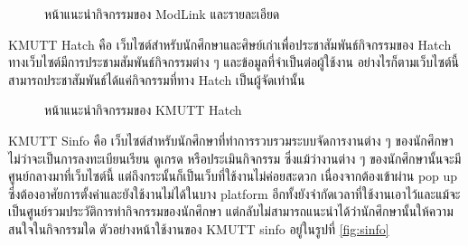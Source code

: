 \documentclass[14pt,oneside,openright,a4paper]{cpe-thai-project}
\begin{document}
  \begin{figure}[!h]\centering
    \setlength{\fboxrule}{0.5mm} %
    \setlength{\fboxsep}{0.5cm}
    \caption{หน้าแนะนำกิจกรรมของ ModLink และรายละเอียด}\label{fig:modlink}
    \end{figure}

\newpage

KMUTT Hatch คือ เว็บไซต์สำหรับนักศึกษาและศิษย์เก่าเพื่อประชาสัมพันธ์กิจกรรมของ Hatch ทางเว็บไซต์มีการประชามสัมพันธ์กิจกรรมต่าง ๆ และข้อมูลที่จำเป็นต่อผู้ใช้งาน อย่างไรก็ตามเว็บไซต์นี้สามารถประชาสัมพันธ์ได้แค่กิจกรรมที่ทาง Hatch เป็นผู้จัดเท่านั้น

  \begin{figure}[!h]\centering
    \setlength{\fboxrule}{0.5mm} %
    \setlength{\fboxsep}{0.5cm}
    \caption{หน้าแนะนำกิจกรรมของ KMUTT Hatch}\label{fig:hatch}
    \end{figure}



KMUTT Sinfo คือ เว็บไซต์สำหรับนักศึกษาที่ทำการรวบรวมระบบจัดการงานต่าง ๆ ของนักศึกษาไม่ว่าจะเป็นการลงทะเบียนเรียน ดูเกรด หรือประเมินกิจกรรม ซึ่งแม้ว่างานต่าง ๆ ของนักศึกษานั้นจะมีศูนย์กลางมาที่เว็บไซต์นี้ แต่ถึงกระนั้นก็เป็นเว็บที่ใช้งานไม่ค่อยสะดวก เนื่องจากต้องเข้าผ่าน pop up ซึ่งต้องอาศัยการตั้งค่าและยังใช้งานไม่ได้ในบาง platform อีกทั้งยังจำกัดเวลาที่ใช้งานเอาไว้และแม้จะเป็นศูนย์รวมประวัติการทำกิจกรรมของนักศึกษา แต่กลับไม่สามารถแนะนำได้ว่านักศึกษานั้นให้ความสนใจในกิจกรรมใด ตัวอย่างหน้าใช้งานของ KMUTT sinfo อยู่ในรูปที่ \ref{fig:sinfo}
\end{document}
